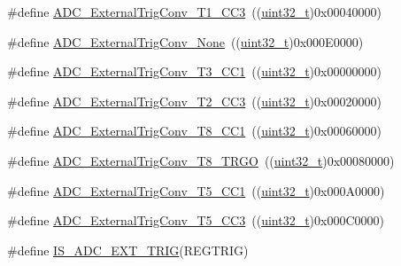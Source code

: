 \begin{DoxyCompactItemize}
\item 
\#define \hyperlink{group___a_d_c__external__trigger__sources__for__regular__channels__conversion_ga41ad03e2921f6de0fb75ae06d6046e63}{A\+D\+C\+\_\+\+External\+Trig\+Conv\+\_\+\+T1\+\_\+\+C\+C3}~((\hyperlink{_p_e___types_8h_a33594304e786b158f3fb30289278f5af}{uint32\+\_\+t})0x00040000)
\item 
\#define \hyperlink{group___a_d_c__external__trigger__sources__for__regular__channels__conversion_ga433a3845ed1792fa6359b763c955e9c2}{A\+D\+C\+\_\+\+External\+Trig\+Conv\+\_\+\+None}~((\hyperlink{_p_e___types_8h_a33594304e786b158f3fb30289278f5af}{uint32\+\_\+t})0x000\+E0000)
\item 
\#define \hyperlink{group___a_d_c__external__trigger__sources__for__regular__channels__conversion_ga3c73d5c8bb0f898dbbc74bcc536f6ec1}{A\+D\+C\+\_\+\+External\+Trig\+Conv\+\_\+\+T3\+\_\+\+C\+C1}~((\hyperlink{_p_e___types_8h_a33594304e786b158f3fb30289278f5af}{uint32\+\_\+t})0x00000000)
\item 
\#define \hyperlink{group___a_d_c__external__trigger__sources__for__regular__channels__conversion_ga16ae1b335f2c2b4facf3d4bedc2ce27f}{A\+D\+C\+\_\+\+External\+Trig\+Conv\+\_\+\+T2\+\_\+\+C\+C3}~((\hyperlink{_p_e___types_8h_a33594304e786b158f3fb30289278f5af}{uint32\+\_\+t})0x00020000)
\item 
\#define \hyperlink{group___a_d_c__external__trigger__sources__for__regular__channels__conversion_ga97af875d12e77a67e84f3aaf1f8033ed}{A\+D\+C\+\_\+\+External\+Trig\+Conv\+\_\+\+T8\+\_\+\+C\+C1}~((\hyperlink{_p_e___types_8h_a33594304e786b158f3fb30289278f5af}{uint32\+\_\+t})0x00060000)
\item 
\#define \hyperlink{group___a_d_c__external__trigger__sources__for__regular__channels__conversion_gab26d94590d47ae6ec46841652741abf3}{A\+D\+C\+\_\+\+External\+Trig\+Conv\+\_\+\+T8\+\_\+\+T\+R\+GO}~((\hyperlink{_p_e___types_8h_a33594304e786b158f3fb30289278f5af}{uint32\+\_\+t})0x00080000)
\item 
\#define \hyperlink{group___a_d_c__external__trigger__sources__for__regular__channels__conversion_ga6bd1ad69cb455afeabf6759b640378d3}{A\+D\+C\+\_\+\+External\+Trig\+Conv\+\_\+\+T5\+\_\+\+C\+C1}~((\hyperlink{_p_e___types_8h_a33594304e786b158f3fb30289278f5af}{uint32\+\_\+t})0x000\+A0000)
\item 
\#define \hyperlink{group___a_d_c__external__trigger__sources__for__regular__channels__conversion_ga95b58981aff35d6d5fa229925cd6315d}{A\+D\+C\+\_\+\+External\+Trig\+Conv\+\_\+\+T5\+\_\+\+C\+C3}~((\hyperlink{_p_e___types_8h_a33594304e786b158f3fb30289278f5af}{uint32\+\_\+t})0x000\+C0000)
\item 
\#define \hyperlink{group___a_d_c__external__trigger__sources__for__regular__channels__conversion_gac74e6054adbedd72822cacde69105318}{I\+S\+\_\+\+A\+D\+C\+\_\+\+E\+X\+T\+\_\+\+T\+R\+IG}(R\+E\+G\+T\+R\+IG)
\end{DoxyCompactItemize}



